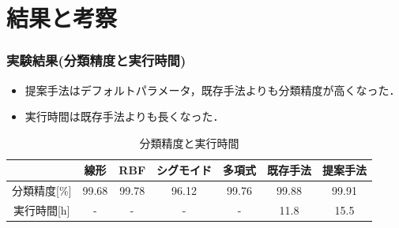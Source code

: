 \documentclass[11pt,dvipdfmx,cjk]{beamer}
\begin{document}
\section{結果と考察}
\begin{frame}
  \frametitle{実験結果(分類精度と実行時間)}
  \begin{itemize}
  \item 提案手法はデフォルトパラメータ，既存手法よりも分類精度が高くなった．
  \item 実行時間は既存手法よりも長くなった．
  \end{itemize}
  \begin{table}[b]
    \scriptsize
    \centering
    \caption{分類精度と実行時間}  %
    \begin{tabular}{|c|c|c|c|c|c|c|}  %
        \hline  %
        ~ & 線形 &RBF &シグモイド&多項式&既存手法 & 提案手法\\  %
        \hline  %
        分類精度[\%]& 99.68&99.78&96.12&99.76&99.88& 99.91\\  %
        \hline  %
        実行時間[h] & - & -&-&-&11.8& 15.5\\  %
        \hline  %
    \end{tabular}
  \end{table}
\end{frame}
\end{document}
